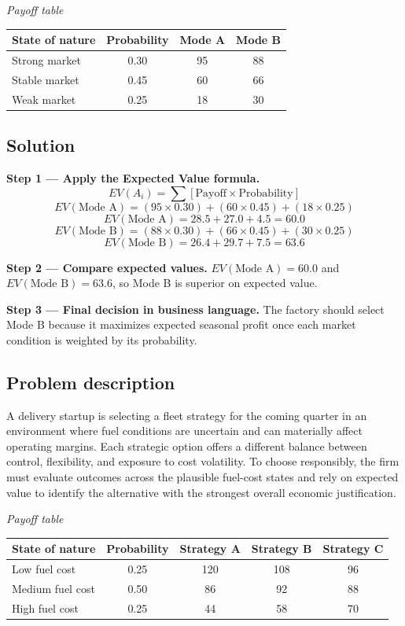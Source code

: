 \begin{ExamProblems}
		\begin{center}
			\textit{Payoff table} \par
			\begin{tabular}{l c c c}
				\toprule
				State of nature & Probability & Mode A & Mode B \\
				\midrule
				Strong market & 0.30 & 95 & 88 \\
				Stable market & 0.45 & 60 & 66 \\
				Weak market & 0.25 & 18 & 30 \\
				\bottomrule
			\end{tabular}
		\end{center}

		\subsection*{Solution}
		\textbf{Step 1 --- Apply the Expected Value formula.}
		\[
		EV(A_i)=\sum [\text{Payoff}\times\text{Probability}]
		\]
		\[
		EV(\text{Mode A})=(95\times0.30)+(60\times0.45)+(18\times0.25)
		\]
		\[
		EV(\text{Mode A})=28.5+27.0+4.5=60.0
		\]
		\[
		EV(\text{Mode B})=(88\times0.30)+(66\times0.45)+(30\times0.25)
		\]
		\[
		EV(\text{Mode B})=26.4+29.7+7.5=63.6
		\]
		
		\textbf{Step 2 --- Compare expected values.}
		$EV(\text{Mode A})=60.0$ and $EV(\text{Mode B})=63.6$, so Mode B is superior on expected value.
		
		\textbf{Step 3 --- Final decision in business language.}
		The factory should select Mode B because it maximizes expected seasonal profit once each market condition is weighted by its probability.
		
		\item
		\subsection*{Problem description}
		A delivery startup is selecting a fleet strategy for the coming quarter in an environment where fuel conditions are uncertain and can materially affect operating margins. Each strategic option offers a different balance between control, flexibility, and exposure to cost volatility. To choose responsibly, the firm must evaluate outcomes across the plausible fuel-cost states and rely on expected value to identify the alternative with the strongest overall economic justification.

		\begin{center}
			\textit{Payoff table} \par
			\begin{tabular}{l c c c c}
				\toprule
				State of nature & Probability & Strategy A & Strategy B & Strategy C \\
				\midrule
				Low fuel cost & 0.25 & 120 & 108 & 96 \\
				Medium fuel cost & 0.50 & 86 & 92 & 88 \\
				High fuel cost & 0.25 & 44 & 58 & 70 \\
				\bottomrule
			\end{tabular}
		\end{center}


\end{ExamProblems}
